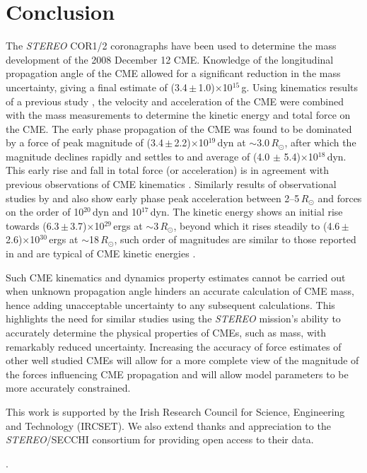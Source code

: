 \documentclass{emulateapj}
\begin{document}
 \section{Conclusion} \label{bozomath}
 The \emph{STEREO} COR1/2 coronagraphs have been used to determine the mass development of the 2008 December 12 CME. Knowledge of the longitudinal propagation angle of the CME allowed for a significant reduction in the mass uncertainty, giving a final estimate of (3.4\,$\pm$\,1.0)$\times$10$^{15}$\,g. Using kinematics results of a previous study \citep{byr10}, the velocity and acceleration of the CME were combined with the mass measurements to determine the kinetic energy and total force on the CME. The early phase propagation of the CME was found to be dominated by a force of peak magnitude of (3.4\,$\pm$\,2.2)$\times$10$^{19}$\,dyn at $\sim$3.0\,$R_{\odot}$, after which the magnitude declines rapidly and settles to and average of (4.0 $\pm$ 5.4)$\times$10$^{18}$\,dyn. This early rise and fall in total force (or acceleration) is in agreement with previous observations of CME kinematics \citep{gallagher03, bein2011}. Similarly results of observational studies by \citet{zhang2001} and \citet{zhang2004} also show early phase peak acceleration between 2--5\,$R_{\odot}$ and forces on the order of 10$^{20}$\,dyn and 10$^{17}$\,dyn. The kinetic energy shows an initial rise towards (6.3\,$\pm$\,3.7)$\times$10$^{29}$\,ergs at $\sim$3\,$R_{\odot}$, beyond which it rises steadily to (4.6\,$\pm$\,2.6)$\times$10$^{30}$\,ergs at $\sim$18\,$R_{\odot}$, such order of magnitudes are similar to those reported in \citet{vou00,emslie2004} and are typical of CME kinetic energies \citep{vour2010}.

Such CME kinematics and dynamics property estimates cannot be carried out when unknown propagation angle hinders an accurate calculation of CME mass, hence adding unacceptable uncertainty to any subsequent calculations. This highlights the need for similar studies using the \emph{STEREO} mission's ability to accurately determine the physical properties of CMEs, such as mass, with remarkably reduced uncertainty. Increasing the accuracy of force estimates of other well studied CMEs will allow for a more complete view of the magnitude of the forces influencing CME propagation and will allow model parameters to be more accurately constrained.\vspace{10 mm} 

This work is supported by the Irish Research Council for Science, Engineering and Technology (IRCSET). We also extend thanks and appreciation to the \emph{STEREO}/SECCHI consortium for providing open access to their data.
 
.


\end{document}
